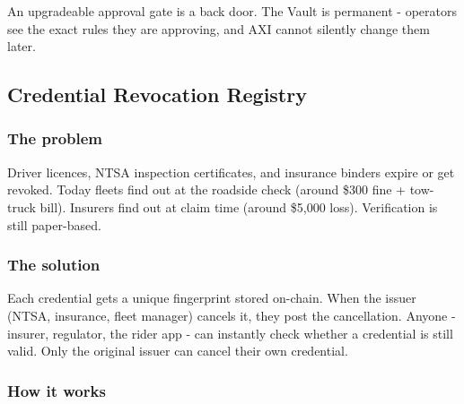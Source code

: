 \documentclass[11pt,a4paper]{article}
\begin{document}
\begin{notebox}[title=Why not upgradeable]
An upgradeable approval gate is a back door. The Vault is permanent - operators see the exact rules they are approving, and AXI cannot silently change them later.
\end{notebox}

\newpage
\subsection{Credential Revocation Registry}

\subsubsection{The problem}
Driver licences, NTSA inspection certificates, and insurance binders expire or get revoked. Today fleets find out at the roadside check (around \$300 fine + tow-truck bill). Insurers find out at claim time (around \$5{,}000 loss). Verification is still paper-based.

\subsubsection{The solution}
Each credential gets a unique fingerprint stored on-chain. When the issuer (NTSA, insurance, fleet manager) cancels it, they post the cancellation. Anyone - insurer, regulator, the rider app - can instantly check whether a credential is still valid. Only the original issuer can cancel their own credential.

\subsubsection{How it works}

\begin{center}
\end{center}
\end{document}
